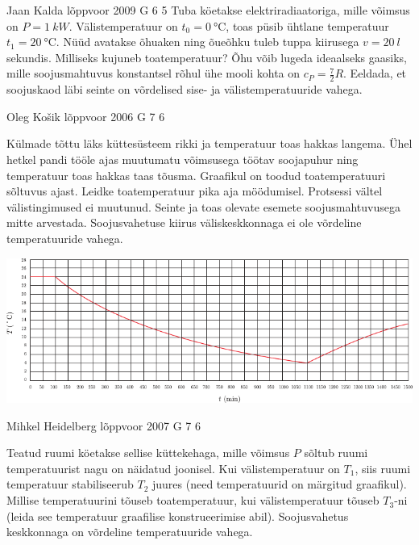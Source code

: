 \documentclass[11pt, twoside]{article}
\begin{document}
{%
{Jaan Kalda} %
{lõppvoor} %
{2009} %
{G 6} %
{5} %
{
\ifStatement
Tuba köetakse elektriradiaatoriga, mille võimsus on $P=\SI{1}{kW}$. Välistemperatuur on $t_0=\SI{0}{\celsius}$, toas püsib ühtlane temperatuur $t_1=\SI{20}{\celsius}$.
Nüüd avatakse õhuaken ning õueõhku tuleb tuppa kiirusega $v=\SI{20}{l}$ sekundis. Milliseks kujuneb toatemperatuur? Õhu võib lugeda ideaalseks gaasiks,
mille soojusmahtuvus konstantsel rõhul ühe mooli kohta on $c_P=\frac 72R$. Eeldada, et soojuskaod läbi seinte on võrdelised sise- ja välistemperatuuride vahega.
\fi
}

{Oleg Košik} %
{lõppvoor} %
{2006} %
{G 7} %
{6} %
{
\ifStatement
Külmade tõttu läks küttesüsteem rikki ja temperatuur toas hakkas langema. Ühel hetkel pandi tööle ajas muutumatu võimsusega töötav soojapuhur ning temperatuur toas hakkas taas tõusma. Graafikul on toodud toatemperatuuri sõltuvus ajast. Leidke toatemperatuur pika aja möödumisel. Protsessi vältel välistingimused ei muutunud. Seinte ja toas olevate esemete soojusmahtuvusega mitte arvestada. Soojusvahetuse kiirus väliskeskkonnaga ei ole võrdeline temperatuuride vahega.

\begin{center}
	\includegraphics[width=\linewidth]{2006-v3g-07-yl}
\end{center}
\fi
}

{Mihkel Heidelberg} %
{lõppvoor} %
{2007} %
{G 7} %
{6} %
{
\ifStatement
Teatud ruumi köetakse sellise küttekehaga, mille võimsus $P$ sõltub ruumi temperatuurist nagu on näidatud joonisel. Kui välistemperatuur on $T_1$, siis ruumi temperatuur stabiliseerub $T_2$ juures (need temperatuurid on märgitud graafikul). Millise temperatuurini tõuseb toatemperatuur, kui välistemperatuur tõuseb $T_3$-ni (leida see temperatuur graafilise konstrueerimise abil). Soojusvahetus keskkonnaga on võrdeline temperatuuride vahega.

}}
\end{document}
